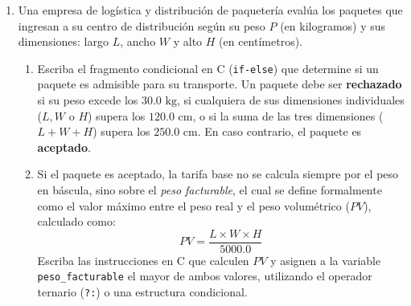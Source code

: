 \documentclass[11pt,letterpaper]{article}
\begin{document}
\begin{enumerate}[label=\textbf{\arabic*.}]
\begin{enumerate}[label=(\alph*)]
        \item El siguiente programa tiene como objetivo calcular el costo unitario prorrateado de un lote de producción, pero al ejecutarse imprime en consola un resultado erróneo de \texttt{\$0.00}:
        \begin{lstlisting}[style=customc]
int total_gastos = 450;
int unidades = 1000;
float costo_unitario;

costo_unitario = total_gastos / unidades;
printf("Costo por unidad: $%.2f\n", costo_unitario);
        \end{lstlisting}
        Identifique con precisión el error conceptual de tipos que provoca este comportamiento y escriba la instrucción de asignación corregida.
        \vspace{3.5cm}
    \end{enumerate}

    \newpage

    \item Una empresa de logística y distribución de paquetería evalúa los paquetes que ingresan a su centro de distribución según su peso $P$ (en kilogramos) y sus dimensiones: largo $L$, ancho $W$ y alto $H$ (en centímetros).
    
    \begin{enumerate}[label=(\alph*)]
        \item Escriba el fragmento condicional en C (\texttt{if-else}) que determine si un paquete es admisible para su transporte. Un paquete debe ser \textbf{rechazado} si su peso excede los $30.0\text{ kg}$, si cualquiera de sus dimensiones individuales ($L, W$ o $H$) supera los $120.0\text{ cm}$, o si la suma de las tres dimensiones ($L + W + H$) supera los $250.0\text{ cm}$. En caso contrario, el paquete es \textbf{aceptado}.
        \vspace{4.5cm}

        \item Si el paquete es aceptado, la tarifa base no se calcula siempre por el peso en báscula, sino sobre el \textit{peso facturable}, el cual se define formalmente como el valor máximo entre el peso real y el peso volumétrico ($PV$), calculado como:
        \[
        PV = \frac{L \times W \times H}{5000.0}
        \]
        Escriba las instrucciones en C que calculen $PV$ y asignen a la variable \texttt{peso\_facturable} el mayor de ambos valores, utilizando el operador ternario (\texttt{?:}) o una estructura condicional.
        \vspace{4.5cm}


\end{enumerate}
\end{enumerate}
\end{document}

